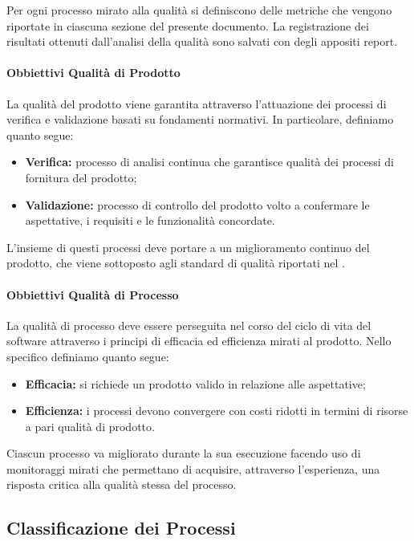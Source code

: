 		Per ogni processo mirato alla qualità si definiscono delle metriche che vengono riportate in ciascuna sezione del presente documento.
		La registrazione dei risultati ottenuti dall'analisi della qualità sono salvati con degli appositi report.

		\paragraph{Obbiettivi Qualità di Prodotto}

			La qualità del prodotto viene garantita attraverso l'attuazione dei processi di verifica e validazione basati su fondamenti normativi. In particolare, definiamo quanto segue:
			\begin{itemize}
				\item \textbf{Verifica:} processo di analisi continua che garantisce qualità dei processi di fornitura del prodotto;
				\item \textbf{Validazione:} processo di controllo del prodotto volto a confermare le aspettative, i requisiti e le funzionalità concordate.
			\end{itemize}

			L'insieme di questi processi deve portare a un miglioramento continuo del prodotto, che viene sottoposto agli standard di qualità riportati nel .

		\paragraph{Obbiettivi Qualità di Processo}

			La qualità di processo deve essere perseguita nel corso del ciclo di vita del software attraverso i principi di efficacia ed efficienza mirati al prodotto.
			Nello specifico definiamo quanto segue:
			\begin{itemize}
				\item \textbf{Efficacia:} si richiede un prodotto valido in relazione alle aspettative;
				\item \textbf{Efficienza:} i processi devono convergere con costi ridotti in termini di risorse a pari qualità di prodotto.
			\end{itemize}

			Ciascun processo va migliorato durante la sua esecuzione facendo uso di monitoraggi mirati che permettano di acquisire, attraverso l'esperienza, una risposta critica alla qualità stessa del processo.

	\subsection{Classificazione dei Processi}

